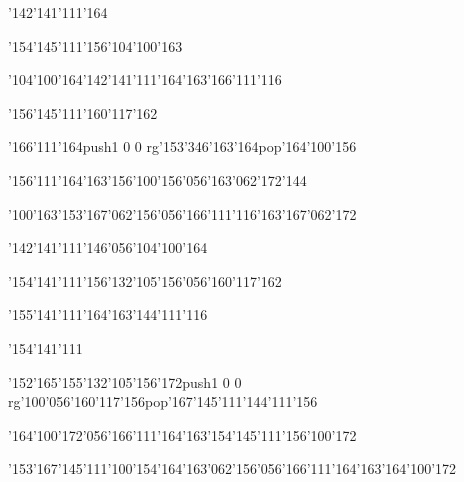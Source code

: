 \null\vfill\ipa\centerline{\enskip\enskip\enskip\enskip\enskip\enskip\enskip\enskip\enskip\enskip\enskip\char'142\char'141\char'111\char'164\enskip\enskip\enskip\enskip}\medskip\centerline{\enskip\enskip\enskip\enskip\char'154\char'145\char'111\char'156\enskip\char'104\char'100\char'163\enskip\enskip\enskip\enskip}\medskip\centerline{\enskip\enskip\char'104\char'100\char'164\enskip\enskip\char'142\char'141\char'111\char'164\char'163\enskip\enskip\enskip\enskip\char'166\char'111\char'116}\medskip\centerline{\enskip\enskip\enskip\enskip\char'156\char'145\char'111\enskip\enskip\enskip\enskip\char'160\char'117\char'162}\medskip\centerline{\enskip\char'166\char'111\char'164\enskip\pdfcolorstack\match push{1 0 0 rg}\char'153\char'346\char'163\char'164\pdfcolorstack\match pop{}\enskip\enskip\char'164\char'100\char'156\enskip\enskip\enskip\enskip\enskip\enskip\enskip\enskip\enskip\enskip}\medskip\centerline{\enskip\enskip\enskip\enskip\enskip\enskip\enskip\char'156\char'111\char'164\char'163\enskip\enskip\enskip\enskip\enskip\char'156\char'100\char'156\char'056\char'163\char'062\char'172\char'144}\medskip\centerline{\enskip\enskip\enskip\enskip\enskip\enskip\enskip\enskip\char'100\char'163\enskip\enskip\enskip\char'153\char'167\char'062\char'156\char'056\char'166\char'111\char'116\enskip\char'163\char'167\char'062\char'172}\medskip\vfill\footline{\hfil\tt\folio\hfil}\eject
\null\vfill\ipa\centerline{\enskip\enskip\enskip\enskip\enskip\enskip\enskip\enskip\enskip\enskip\enskip\char'142\char'141\char'111\char'146\char'056\char'104\char'100\char'164}\medskip\centerline{\enskip\enskip\enskip\enskip\char'154\char'141\char'111\char'156\enskip\char'132\char'105\char'156\char'056\char'160\char'117\char'162}\medskip\centerline{\enskip\enskip\enskip\enskip\enskip\enskip\char'155\char'141\char'111\char'164\char'163\enskip\enskip\enskip\enskip\char'144\char'111\char'116}\medskip\centerline{\enskip\enskip\enskip\enskip\char'154\char'141\char'111\enskip\enskip\enskip\enskip\enskip\enskip\enskip}\medskip\centerline{\enskip\char'152\char'165\char'155\enskip\char'132\char'105\char'156\char'172\enskip\pdfcolorstack\match push{1 0 0 rg}\char'100\char'056\char'160\char'117\char'156\pdfcolorstack\match pop{}\enskip\char'167\char'145\char'111\enskip\enskip\enskip\char'144\char'111\char'156}\medskip\centerline{\enskip\enskip\enskip\enskip\char'164\char'100\char'172\char'056\char'166\char'111\char'164\char'163\enskip\char'154\char'145\char'111\enskip\char'156\char'100\char'172\enskip\enskip\enskip\enskip\enskip}\medskip\centerline{\enskip\char'153\char'167\char'145\char'111\enskip\enskip\enskip\enskip\char'100\char'154\enskip\enskip\enskip\char'164\char'163\char'062\char'156\char'056\char'166\char'111\char'164\enskip\char'163\char'164\char'100\char'172}\medskip\vfill\footline{\hfil\tt\folio\hfil}\eject
